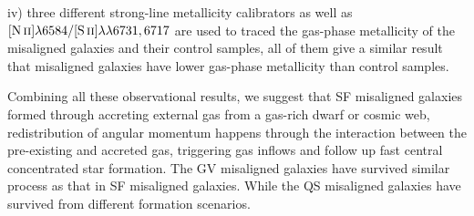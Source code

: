iv) three different strong-line metallicity calibrators as well as $\hbox{[N\,{\sc ii}]}\lambda6584/\hbox{[S\,{\sc ii}]}\lambda\lambda6731,6717$ are used to traced the gas-phase metallicity of the misaligned galaxies and their control samples, all of them give a similar result that misaligned galaxies have lower gas-phase metallicity than control samples.

Combining all these observational results, we suggest that SF misaligned galaxies formed through accreting external gas from a gas-rich dwarf or cosmic web, redistribution of angular momentum happens through the interaction between the pre-existing and accreted gas, triggering gas inflows and follow up fast central concentrated star formation. The GV misaligned galaxies have survived similar process as that in SF misaligned galaxies. While the QS misaligned galaxies have survived from different formation scenarios.
